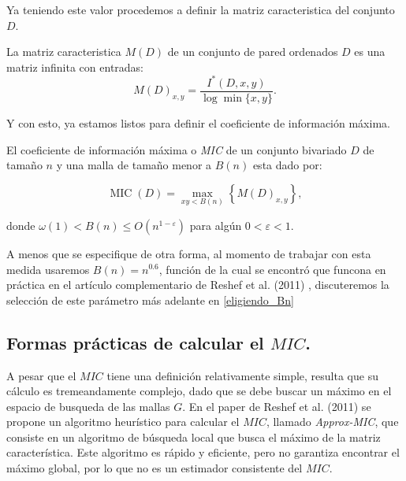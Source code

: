         Ya teniendo este valor procedemos a definir la matriz caracteristica del conjunto $D$.
    
        \begin{defn}
            La matriz caracteristica $M(D)$ de un conjunto de pared ordenados $D$ es una matriz infinita con entradas:
            $$
            M(D)_{x, y}=\frac{I^{*}(D, x, y)}{\log \min \{x, y\}}.
            $$
        \end{defn}

        Y con esto, ya estamos listos para definir el coeficiente de informaci\'on m\'axima.

        \begin{defn}
            El coeficiente de informaci\'on m\'axima o \textit{MIC} de un conjunto bivariado $D$ de tama\~no $n$ y una malla de tama\~no menor a $B(n)$ esta dado por:
    
            $$
            \operatorname{MIC}(D)=\max _{x y<B(n)}\left\{M(D)_{x, y}\right\},
            $$
    
            donde $\omega(1)<B(n) \leq O\left(n^{1-\varepsilon}\right)$ para alg\'un $0<\varepsilon<1$.
        \end{defn}
        \begin{rem}
            A menos que se especifique de otra forma, al momento de trabajar con esta medida usaremos $B(n)=n^{0.6}$, funci\'on de la cual se encontr\'o que funcona en pr\'actica en el art\'iculo complementario de Reshef et al. (2011) \cite[]{Reshef2011}, discuteremos la selecci\'on de este par\'ametro m\'as adelante en \ref{eligiendo_Bn}
        \end{rem}
    
    
        \subsection[Formas practicas de calcular el MIC.]{Formas pr\'acticas de calcular el $MIC$.}

        A pesar que el $MIC$ tiene una definici\'on relativamente simple, resulta que su c\'alculo es tremeandamente complejo, dado que se debe buscar un m\'aximo en el espacio de busqueda de las mallas $G$. En el paper de Reshef et al. (2011) \cite{Reshef2011} se propone un algoritmo heur\'istico para calcular el $MIC$, llamado \textit{Approx-MIC}, que consiste en un algoritmo de b\'usqueda local que busca el m\'aximo de la matriz caracter\'istica. Este algoritmo es r\'apido y eficiente, pero no garantiza encontrar el m\'aximo global, por lo que no es un estimador consistente del $MIC$.
    
